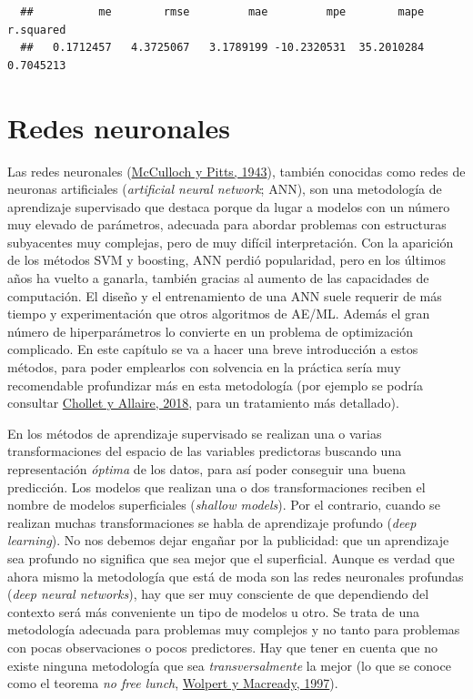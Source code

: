 \documentclass[
]{book}
\theoremstyle{break}
\theoremstyle{nonumberplain}
\begin{document}
\begin{verbatim}
  ##          me        rmse         mae         mpe        mape   r.squared 
  ##   0.1712457   4.3725067   3.1789199 -10.2320531  35.2010284   0.7045213
\end{verbatim}

\hypertarget{neural-nets}{%
\chapter{Redes neuronales}\label{neural-nets}}

Las redes neuronales (\protect\hyperlink{ref-mcculloch1943logical}{McCulloch y Pitts, 1943}), también conocidas como redes de neuronas artificiales (\emph{artificial neural network}; ANN), son una metodología de aprendizaje supervisado que destaca porque da lugar a modelos con un número muy elevado de parámetros, adecuada para abordar problemas con estructuras subyacentes muy complejas, pero de muy difícil interpretación.
Con la aparición de los métodos SVM y boosting, ANN perdió popularidad, pero en los últimos años ha vuelto a ganarla, también gracias al aumento de las capacidades de computación.
El diseño y el entrenamiento de una ANN suele requerir de más tiempo y experimentación que otros algoritmos de AE/ML.
Además el gran número de hiperparámetros lo convierte en un problema de optimización complicado.
En este capítulo se va a hacer una breve introducción a estos métodos, para poder emplearlos con solvencia en la práctica sería muy recomendable profundizar más en esta metodología (por ejemplo se podría consultar \protect\hyperlink{ref-chollet2018deep}{Chollet y Allaire, 2018}, para un tratamiento más detallado).

En los métodos de aprendizaje supervisado se realizan una o varias transformaciones del espacio de las variables predictoras buscando una representación \emph{óptima} de los datos, para así poder conseguir una buena predicción.
Los modelos que realizan una o dos transformaciones reciben el nombre de modelos superficiales (\emph{shallow models}).
Por el contrario, cuando se realizan muchas transformaciones se habla de aprendizaje profundo (\emph{deep learning}).
No nos debemos dejar engañar por la publicidad: que un aprendizaje sea profundo no significa que sea mejor que el superficial.
Aunque es verdad que ahora mismo la metodología que está de moda son las redes neuronales profundas (\emph{deep neural networks}), hay que ser muy consciente de que dependiendo del contexto será más conveniente un tipo de modelos u otro.
Se trata de una metodología adecuada para problemas muy complejos y no tanto para problemas con pocas observaciones o pocos predictores.
Hay que tener en cuenta que no existe ninguna metodología que sea \emph{transversalmente} la mejor (lo que se conoce como el teorema \emph{no free lunch}, \protect\hyperlink{ref-wolpert1997no}{Wolpert y Macready, 1997}).
\end{document}
